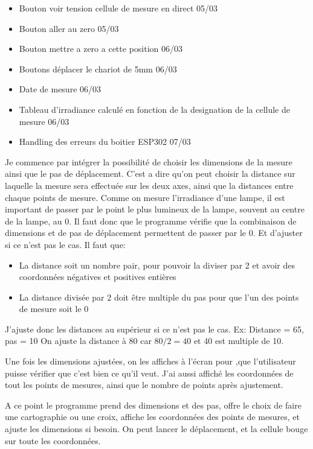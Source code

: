 \documentclass[a4paper, 12pt]{article}
\begin{document}
\begin{itemize}
	\item [ ] Bouton voir tension cellule de mesure en direct  05/03
	\item [ ] Bouton aller au zero  05/03
	\item [ ] Bouton mettre a zero a cette position  06/03
	\item [ ] Boutons déplacer le chariot de 5mm  06/03
	\item [ ] Date de mesure  06/03
	\item [ ] Tableau d'irradiance calculé en fonction de la designation de la cellule de mesure  06/03
	\item [ ] Handling des erreurs du boitier ESP302 07/03 
	\end{itemize}
  
Je commence par intégrer la possibilité de choisir les dimensions de la mesure ainsi que le pas de déplacement.  
C'est a dire qu'on peut choisir la distance sur laquelle la mesure sera effectuée sur les deux axes, ainsi que la distances entre chaque points de mesure.  
Comme on mesure l'irradiance d'une lampe, il est important de passer par le point le plus lumineux de la lampe, souvent au centre de la lampe, au 0.  
Il faut donc que le programme vérifie que la combinaison de dimensions et de pas de déplacement permettent de passer par le 0.  
Et d'ajuster si ce n'est pas le cas.  
Il faut que:  
\begin{itemize}
	\item La distance soit un nombre pair, pour pouvoir la diviser par 2 et avoir des coordonnées négatives et positives entières  
	\item La distance divisée par 2 doit être multiple du pas pour que l'un des points de mesure soit le 0  
\end{itemize}


J'ajuste donc les distances au supérieur si ce n'est pas le cas. Ex:  
Distance = 65, pas = 10  
On ajuste la distance à 80 car $80/2 = 40$ et 40 est multiple de 10.  
  
Une fois les dimensions ajustées, on les affiches à l'écran pour ,que l'utilisateur puisse vérifier que c'est bien ce qu'il veut.  
J'ai aussi affiché les coordonnées de tout les points de mesures, ainsi que le nombre de points après ajustement.  
  
A ce point le programme prend des dimensions et des pas, offre le choix de faire une cartographie ou une croix, affiche les coordonnées des points de mesures, et ajuste les dimensions si besoin.  
On peut lancer le déplacement, et la cellule bouge sur toute les coordonnées.  
  
\end{document}
